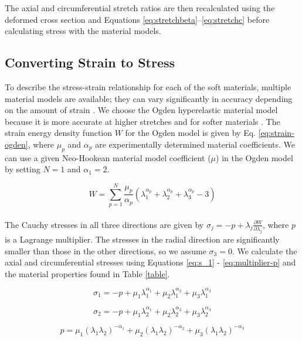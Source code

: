 The axial and circumferential stretch ratios are then recalculated using the deformed cross section and Equations \ref{eq:stretchbeta}--\ref{eq:stretchc} before calculating stress with the material models.

\subsection{Converting Strain to Stress}

To describe the stress-strain relationship for each of the soft materials, multiple material models are available; they can vary significantly in accuracy depending on the amount of strain \cite{paterno_hybrid_2018}. We choose the Ogden hyperelastic material model because it is more accurate at higher stretches and for softer materials \cite{marechal_toward_2021}. The strain energy density function $W$ for the Ogden model is given by Eq. \ref{eq:strain-ogden}, where $\mu_{p}$ and $\alpha_{p}$ are experimentally determined material coefficients. We can use a given Neo-Hookean material model coefficient ($\mu$) in the Ogden model by setting $N=1$ and $\alpha_1=2$. 

\begin{equation}
    W=\sum_{p=1}^N \frac{\mu_p}{\alpha_p}(\lambda_1^{\alpha_p}+\lambda_2^{\alpha_p}+\lambda_3^{\alpha_p}-3)
    \label{eq:strain-ogden}
\end{equation}
\\
The Cauchy stresses in all three directions are given by $\sigma_j=-p+\lambda_j\frac{\partial W}{\partial\lambda_j}$, where $p$ is a Lagrange multiplier. The stresses in the radial direction are significantly smaller than those in the other directions, so we assume $\sigma_3=0$. We calculate the axial and circumferential stresses using Equations \ref{eq:s_1} - \ref{eq:multiplier-p} and the material properties found in Table \ref{table}. 

\begin{equation}
    \sigma_1 =-p+\mu_1\lambda_1^{\alpha_1}+\mu_2\lambda_1^{\alpha_2}+\mu_3\lambda_1^{\alpha_3}
    \label{eq:s_1}
\end{equation}

\begin{equation}
    \sigma_2 =-p+\mu_1\lambda_2^{\alpha_1}+\mu_2\lambda_2^{\alpha_2}+\mu_3\lambda_2^{\alpha_3}
    \label{eq:s_2}
\end{equation}

\begin{equation}
    p=\mu_1(\lambda_1\lambda_2)^{-\alpha_1}+\mu_2(\lambda_1\lambda_2)^{-\alpha_2}+\mu_3(\lambda_1\lambda_2)^{-\alpha_3}
    \label{eq:multiplier-p}
\end{equation}

